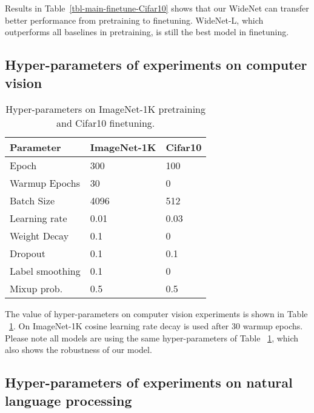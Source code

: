 \documentclass[letterpaper]{article} \usepackage{aaai22}  \usepackage{times}  \usepackage{helvet}  \usepackage{courier}  \usepackage[hyphens]{url}  \usepackage{graphicx} \urlstyle{rm} \def\UrlFont{\rm}  \usepackage{natbib}  \usepackage{caption} \DeclareCaptionStyle{ruled}{labelfont=normalfont,labelsep=colon,strut=off} \frenchspacing  \setlength{\pdfpagewidth}{8.5in}  \setlength{\pdfpageheight}{11in}  \usepackage{algorithm}
\begin{document}
Results in Table~\ref{tbl-main-finetune-Cifar10} shows that our WideNet can transfer better performance from pretraining to finetuning. WideNet-L, which outperforms all baselines in pretraining, is still the best model in finetuning.



\subsection{Hyper-parameters of experiments on computer vision}\label{appendix:cv-hyper}


\begin{table}[ht]
\centering
\caption{Hyper-parameters on ImageNet-1K pretraining and Cifar10 finetuning.}
\label{tbl-hyper-parameter-pretrain}
\begin{tabular}{l|l l}
\toprule
Parameter                  & ImageNet-1K  & Cifar10   \\ \midrule
Epoch                     & 300     & 100     \\
Warmup Epochs             & 30    & 0       \\
Batch Size                & 4096  & 512      \\
Learning rate             & 0.01  & 0.03  \\
Weight Decay              & 0.1   & 0  \\
Dropout                   & 0.1   & 0.1    \\ 
Label smoothing           & 0.1    & 0     \\
Mixup prob.               & 0.5   & 0.5     \\
\bottomrule
\end{tabular}
\end{table}

The value of hyper-parameters on computer vision experiments is shown in Table ~\ref{tbl-hyper-parameter-pretrain}. On ImageNet-1K cosine learning rate decay is used after 30 warmup epochs. Please note all models are using the same hyper-parameters of Table ~\ref{tbl-hyper-parameter-pretrain}, which also shows the robustness of our model. 

\subsection{Hyper-parameters of experiments on natural language processing}
\label{appendix:nlp-hyper}
\end{document}
